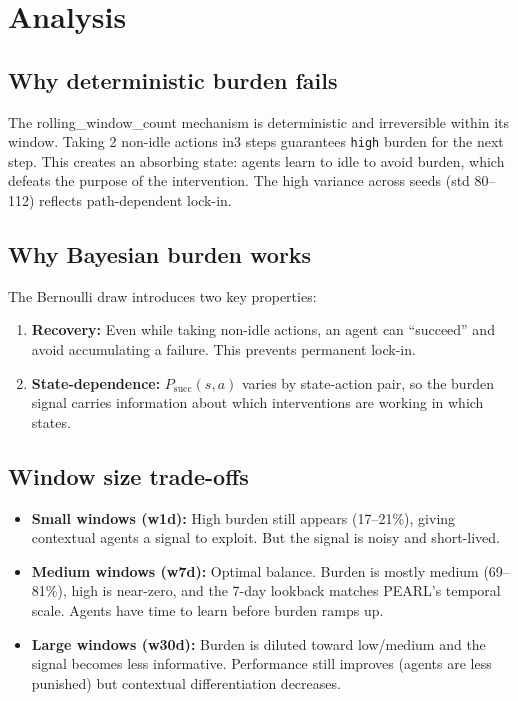 \documentclass[11pt,a4paper]{article}
\begin{document}
\section{Analysis}

\subsection{Why deterministic burden fails}
The rolling\_window\_count mechanism is deterministic and irreversible
within its window.  Taking 2 non-idle actions in3 steps guarantees
\texttt{high} burden for the next step.  This creates an absorbing
state: agents learn to idle to avoid burden, which defeats the purpose
of the intervention.  The high variance across seeds (std 80--112)
reflects path-dependent lock-in.

\subsection{Why Bayesian burden works}
The Bernoulli draw introduces two key properties:
\begin{enumerate}
  \item \textbf{Recovery:} Even while taking non-idle actions, an agent
    can ``succeed'' and avoid accumulating a failure.  This prevents
    permanent lock-in.
  \item \textbf{State-dependence:} $P_{\text{succ}}(s,a)$ varies by
    state-action pair, so the burden signal carries information about
    which interventions are working in which states.
\end{enumerate}

\subsection{Window size trade-offs}
\begin{itemize}
  \item \textbf{Small windows (w1d):} High burden still appears
    (17--21\%), giving contextual agents a signal to exploit.  But the
    signal is noisy and short-lived.
  \item \textbf{Medium windows (w7d):} Optimal balance.  Burden is
    mostly medium (69--81\%), high is near-zero, and the 7-day lookback
    matches PEARL's temporal scale.  Agents have time to learn before
    burden ramps up.
  \item \textbf{Large windows (w30d):} Burden is diluted toward low/medium
    and the signal becomes less informative.  Performance still improves
    (agents are less punished) but contextual differentiation decreases.
\end{itemize}
\end{document}

